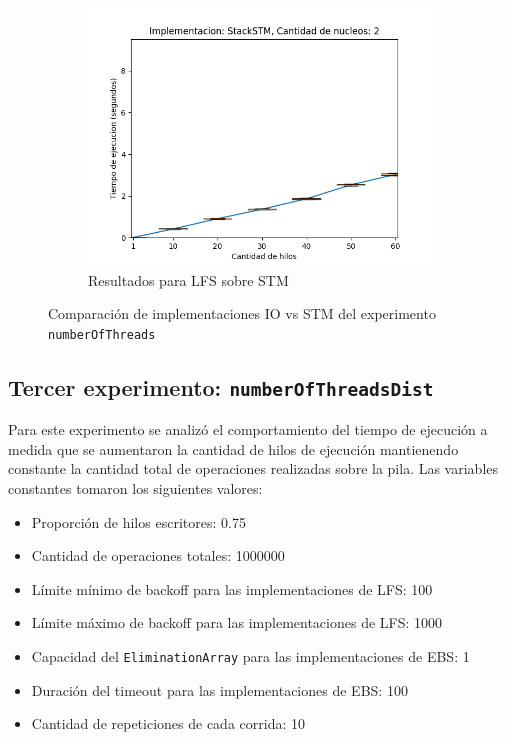 \begin{figure}[H]
\begin{subfigure}[b]{0.49\textwidth}
        \includegraphics[width=\textwidth]{images/numberOfThreads/plots/expStackSTM-2}
        \caption{Resultados para LFS sobre STM}
        \label{subfig:numberOfThreads-stackstm-2}
    \end{subfigure}
    \caption{Comparación de implementaciones IO vs STM del experimento \texttt{numberOfThreads}}
    \label{fig:numberOfThreads-boxplots}
\end{figure}




\clearpage
\subsection{Tercer experimento: \texttt{numberOfThreadsDist}}
Para este experimento se analizó el comportamiento del tiempo de ejecución a medida que se aumentaron la cantidad de hilos de ejecución mantienendo constante la cantidad total de operaciones realizadas sobre la pila.
Las variables constantes tomaron los siguientes valores:

\begin{itemize}
    \item Proporción de hilos escritores: 0.75
    \item Cantidad de operaciones totales: 1000000
    \item Límite mínimo de backoff para las implementaciones de LFS: 100
    \item Límite máximo de backoff para las implementaciones de LFS: 1000
    \item Capacidad del \texttt{EliminationArray} para las implementaciones de EBS: 1
    \item Duración del timeout para las implementaciones de EBS: 100
    \item Cantidad de repeticiones de cada corrida: 10
\end{itemize}

